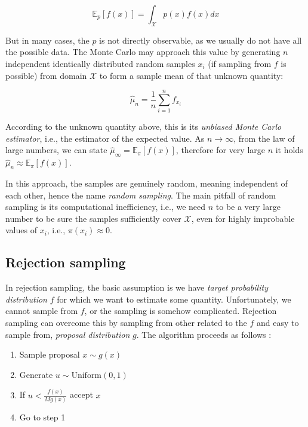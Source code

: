 \documentclass[
  digital, %
  oneside, %
  lof,     %
  lot,     %
]{fithesis4}
\begin{document}
\begin{equation}\label{eq:random-sampling-expectation}
  \mathbb{E}_{p}\left[ f(x) \right] = \int_{\mathcal{X}} p \left( x \right) f \left( x \right) dx
\end{equation}

But in many cases, the $p$ is not directly observable, as we usually do not have all the possible data.
The Monte Carlo may approach this value by generating $n$ independent identically distributed random samples $x_i$ (if sampling from $f$ is possible) from domain $\mathcal{X}$ to form a sample mean of that unknown quantity:

\begin{equation}
  \hat{\mu}_n = \frac{1}{n} \sum_{i=1}^{n} f_{x_i}
\end{equation}

According to the unknown quantity above, this is its \textit{unbiased Monte Carlo estimator}, i.e., the estimator of the expected value. 
As $n \to \infty$, from the law of large numbers, we can state $\hat{\mu}_{\infty} = \mathbb{E}_{\pi}\left[ f(x) \right]$, therefore for very large $n$ it holds $\hat{\mu}_n \approx \mathbb{E}_{\pi}\left[ f(x) \right]$.

In this approach, the samples are genuinely random, meaning independent of each other, hence the name \textit{random sampling}.
The main pitfall of random sampling is its computational inefficiency, i.e., we need $n$ to be a very large number to be sure the samples sufficiently cover $\mathcal{X}$, even for highly improbable values of $x_i$, i.e., $\pi(x_i) \approx 0$.


\subsection{Rejection sampling}
\label{sec:rejection-sampling}

In rejection sampling, the basic assumption is we have \textit{target probability distribution} $f$ for which we want to estimate some quantity.
Unfortunately, we cannot sample from $f$, or the sampling is somehow complicated.
Rejection sampling can overcome this by sampling from other related to the $f$ and easy to sample from, \textit{proposal distribution} $g$.
The algorithm proceeds as follows \cite{beichl2000}:

\begin{enumerate}
  \item Sample proposal $x \sim g(x)$
  \item Generate $u \sim \text{Uniform}(0, 1)$
  \item If $u < \frac{f(x)}{M g(x)}$ accept $x$
  \item Go to step 1
\end{enumerate}
\end{document}
